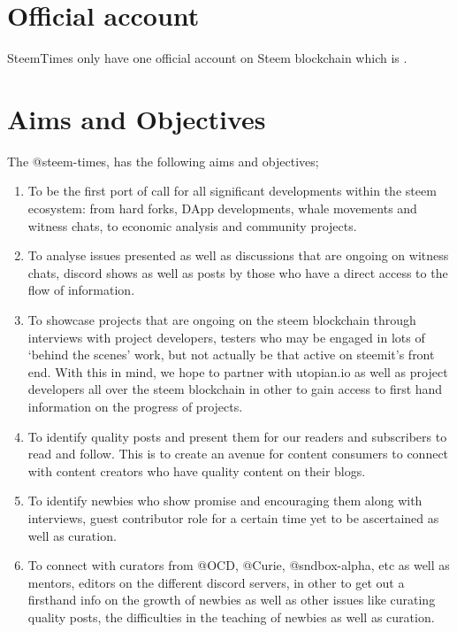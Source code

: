 \documentclass[a4paper,12pt]{article}
\newcommand{\lnk}[3][blue]{\href{#2}{\color{#1}{#3}}}%
\newcommand{\sectionbreak}{\clearpage}
\begin{document}
\section {Official account}

SteemTimes only have one official account on Steem blockchain which is \textbf{\lnk{https://steemit.com/@steem-times}{@steem-times}}.

\sectionbreak

\section {Aims and Objectives}

The @steem-times, has the following aims and objectives;

\begin{enumerate}
  \item To be the first port of call for all significant developments within the steem ecosystem: from hard forks, DApp developments, whale movements and witness chats, to economic analysis and community projects.
  \item To analyse issues presented as well as discussions that are ongoing on witness chats, discord shows as well as posts by those who have a direct access to the flow of information. 
  \item To showcase projects that are ongoing on the steem blockchain through interviews with project developers, testers who may be engaged in lots of ‘behind the scenes’ work, but not actually be that active on steemit’s front end. With this in mind, we hope to partner with utopian.io as well as project developers all over the steem blockchain in other to gain access to first hand information on the progress of projects.
  \item To identify quality posts and present them for our readers and subscribers to read and follow. This is to create an avenue for content consumers to connect with content creators who have quality content on their blogs.
  \item To identify newbies who show promise and encouraging them along with interviews, guest contributor role for a certain time yet to be ascertained as well as curation. 
  \item To connect with curators from @OCD, @Curie, @sndbox-alpha, etc as well as mentors, editors on the different discord servers, in other to get out a firsthand info on the growth of newbies as well as other issues like curating quality posts, the difficulties in the teaching of newbies as well as curation.
\end{enumerate}
\end{document}
